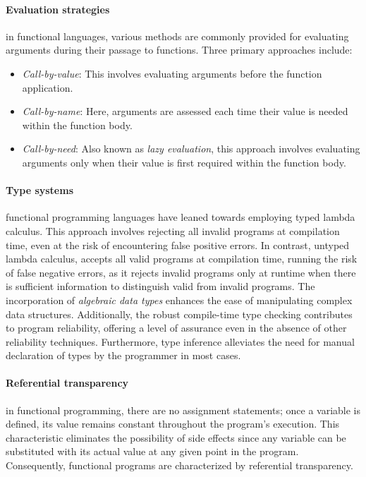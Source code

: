 \paragraph{Evaluation strategies}

in functional languages, various methods are commonly provided for evaluating arguments during their passage to functions. Three primary approaches include:

\begin{itemize}
    \item \textit{Call-by-value}: This involves evaluating arguments before the function application.
    \item \textit{Call-by-name}: Here, arguments are assessed each time their value is needed within the function body.
    \item \textit{Call-by-need}: Also known as \textit{lazy evaluation}, this approach involves evaluating arguments only when their value is first required within the function body.
\end{itemize}

\paragraph{Type systems}

functional programming languages have leaned towards employing typed lambda calculus. This approach involves rejecting all invalid programs at compilation time, even at the risk of encountering false positive errors. In contrast, untyped lambda calculus, accepts all valid programs at compilation time, running the risk of false negative errors, as it rejects invalid programs only at runtime when there is sufficient information to distinguish valid from invalid programs. The incorporation of \textit{algebraic data types} enhances the ease of manipulating complex data structures. Additionally, the robust compile-time type checking contributes to program reliability, offering a level of assurance even in the absence of other reliability techniques. Furthermore, type inference alleviates the need for manual declaration of types by the programmer in most cases.

\paragraph{Referential transparency}

in functional programming, there are no assignment statements; once a variable is defined, its value remains constant throughout the program's execution. This characteristic eliminates the possibility of side effects since any variable can be substituted with its actual value at any given point in the program. Consequently, functional programs are characterized by referential transparency.

